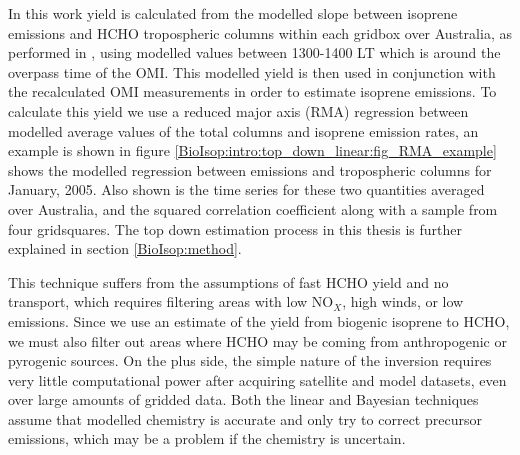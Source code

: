       In this work yield is calculated from the modelled slope between isoprene emissions and HCHO tropospheric columns within each gridbox over Australia, as performed in \textcite{Palmer2003}, using modelled values between 1300-1400 LT which is around the overpass time of the OMI.
      This modelled yield is then used in conjunction with the recalculated OMI measurements in order to estimate isoprene emissions.
      To calculate this yield we use a reduced major axis (RMA) regression between modelled average values of the total columns and isoprene emission rates, an example is shown in figure \ref{BioIsop:intro:top_down_linear:fig_RMA_example} shows the modelled regression between emissions and tropospheric columns for January, 2005. Also shown is the time series for these two quantities averaged over Australia, and the squared correlation coefficient along with a sample from four gridsquares.
      The top down estimation process in this thesis is further explained in section \ref{BioIsop:method}.
      
      {\label{BioIsop:intro:top_down_linear:fig_RMA_example}}
      
      This technique suffers from the assumptions of fast HCHO yield and no transport, which requires filtering areas with low NO$_X$, high winds, or low emissions.
      Since we use an estimate of the yield from biogenic isoprene to HCHO, we must also filter out areas where HCHO may be coming from anthropogenic or pyrogenic sources.
      On the plus side, the simple nature of the inversion requires very little computational power after acquiring satellite and model datasets, even over large amounts of gridded data.
      Both the linear and Bayesian techniques assume that modelled chemistry is accurate and only try to correct precursor emissions, which may be a problem if the chemistry is uncertain.
      

